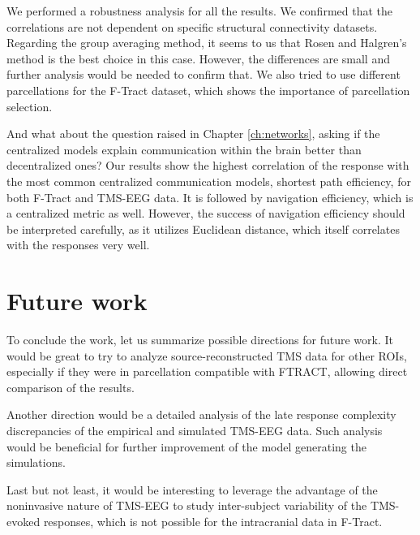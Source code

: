 We performed a robustness analysis for all the results. We confirmed that the correlations are not dependent on specific structural connectivity datasets. Regarding the group averaging method, it seems to us that Rosen and Halgren's method is the best choice in this case. However, the differences are small and further analysis would be needed to confirm that. We also tried to use different parcellations for the F-Tract dataset, which shows the importance of parcellation selection.

And what about the question raised in Chapter \ref{ch:networks}, asking if the centralized models explain communication within the brain better than decentralized ones? Our results show the highest correlation of the response with the most common centralized communication models, shortest path efficiency, for both F-Tract and TMS-EEG data. It is followed by navigation efficiency, which is a centralized metric as well. However, the success of navigation efficiency should be interpreted carefully, as it utilizes Euclidean distance, which itself correlates with the responses very well.

\section*{Future work}

To conclude the work, let us summarize possible directions for future work. It would be great to try to analyze source-reconstructed TMS data for other ROIs, especially if they were in parcellation compatible with FTRACT, allowing direct comparison of the results.

Another direction would be a detailed analysis of the late response complexity discrepancies of the empirical and simulated TMS-EEG data. Such analysis would be beneficial for further improvement of the model generating the simulations.

Last but not least, it would be interesting to leverage the advantage of the noninvasive nature of TMS-EEG to study inter-subject variability of the TMS-evoked responses, which is not possible for the intracranial data in F-Tract.